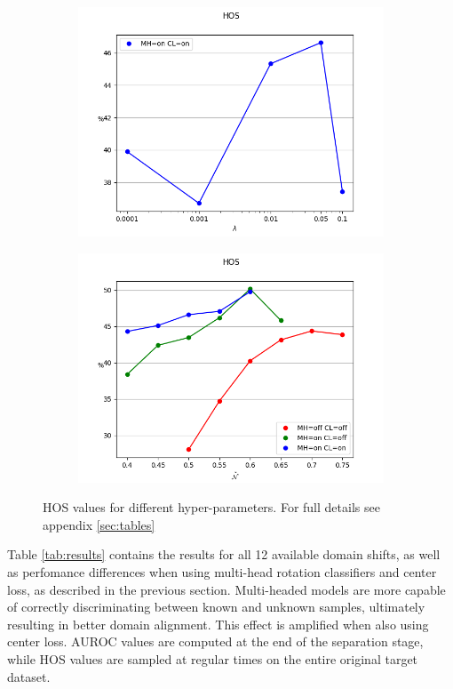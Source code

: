 \documentclass[10pt,twocolumn,letterpaper]{article}
\begin{document}
\begin{figure}[!htb]
\begin{subfigure}[!htb]{0.35\textwidth}
    \includegraphics[trim=0 0 0 2cm, clip, width=\linewidth]{hos-l.png}
  \end{subfigure}
  \begin{subfigure}[!htb]{0.35\textwidth}
    \includegraphics[trim=0 0 0 2cm, clip, width=\linewidth]{hos-th.png}
  \end{subfigure}
  \caption{\centering\label{fig:hyperparams} HOS values for different hyper-parameters. For full details see appendix \ref{sec:tables}}
\end{figure}

Table \ref{tab:results} contains the results for all 12 available domain shifts,
as well as perfomance differences when using multi-head rotation classifiers and center loss,
as described in the previous section.
Multi-headed models are more capable of correctly discriminating between known and unknown samples,
ultimately resulting in better domain alignment.
This effect is amplified when also using center loss.
AUROC values are computed at the end of the separation stage, 
while HOS values are sampled at regular times on the entire original target dataset.
\end{document}
